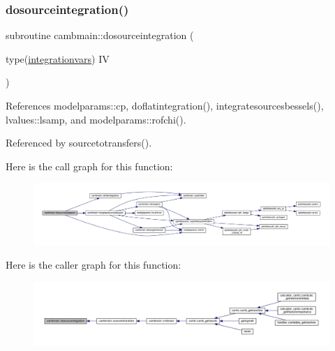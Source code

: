 \subsubsection{\texorpdfstring{dosourceintegration()}{dosourceintegration()}}
{\footnotesize\ttfamily subroutine cambmain\+::dosourceintegration (\begin{DoxyParamCaption}\item[{type(\mbox{\hyperlink{structcambmain_1_1integrationvars}{integrationvars}})}]{IV }\end{DoxyParamCaption})\hspace{0.3cm}{\ttfamily [private]}}



References modelparams\+::cp, doflatintegration(), integratesourcesbessels(), lvalues\+::lsamp, and modelparams\+::rofchi().



Referenced by sourcetotransfers().

Here is the call graph for this function\+:
\nopagebreak
\begin{figure}[H]
\begin{center}
\leavevmode
\includegraphics[width=350pt]{namespacecambmain_a89b9b0f69a8f18b112b2309db4ad29c6_cgraph}
\end{center}
\end{figure}
Here is the caller graph for this function\+:
\nopagebreak
\begin{figure}[H]
\begin{center}
\leavevmode
\includegraphics[width=350pt]{namespacecambmain_a89b9b0f69a8f18b112b2309db4ad29c6_icgraph}
\end{center}
\end{figure}
\mbox{\label{namespacecambmain_a9ff2ea693941648b6f34d86e019f9613}} 
